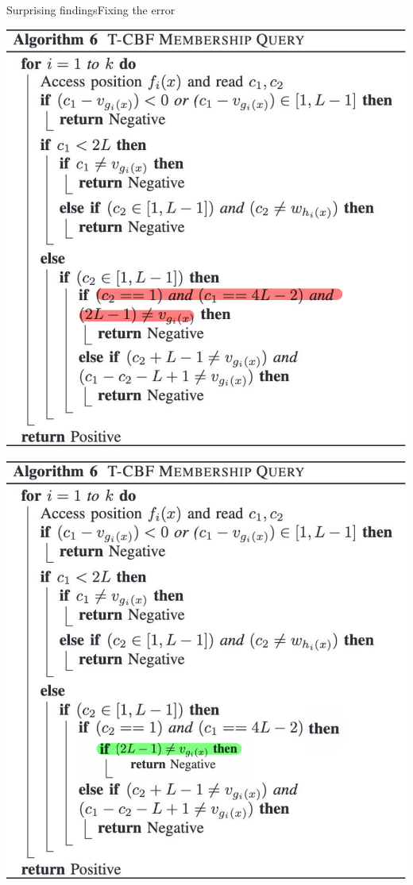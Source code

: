 \documentclass[
  english,            %
  aspectratio=169,    %
]{tumbeamer}
\begin{document}
\begin{frame}{Surprising findings}{Fixing the error}
  \begin{minipage}{0.38\textwidth}
    \centering
    \includegraphics[width=\linewidth]{img/tbf_lookup_pseudo_mark.pdf}
  \end{minipage}
  \hspace{0.1\textwidth} 
  \begin{minipage}{0.4\textwidth}
    \centering
    \includegraphics[width=\linewidth]{img/tbf_lookup_pseudo_fix_mark.pdf}
  \end{minipage}
\end{frame}
\end{document}
